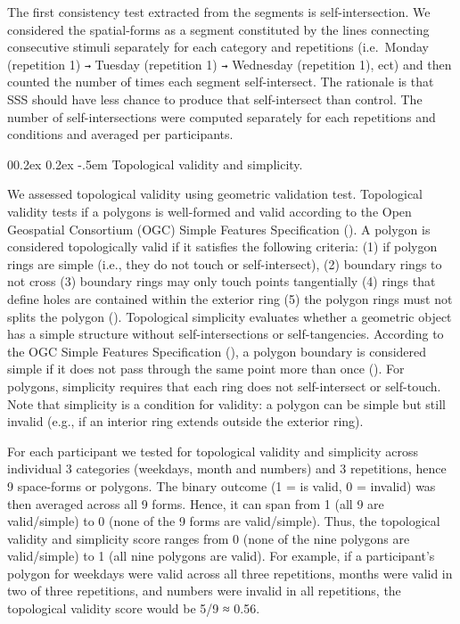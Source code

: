 \documentclass[
  man,
  longtable,
  a4paper,
  nolmodern,
  notxfonts,
  notimes,
  colorlinks=true,linkcolor=blue,citecolor=blue,urlcolor=blue]{apa7}
\makeatletter
\renewcommand{\paragraph}{\@startsection{paragraph}{4}{\parindent}%
	{0\baselineskip \@plus 0.2ex \@minus 0.2ex}%
	{-.5em}%
	{\normalfont\normalsize\bfseries\typesectitle}}
\makeatother
\begin{document}
The first consistency test extracted from the segments is
self-intersection. We considered the spatial-forms as a segment
constituted by the lines connecting consecutive stimuli separately for
each category and repetitions (i.e.~Monday (repetition 1) \texttt{→}
Tuesday (repetition 1) \texttt{→} Wednesday (repetition 1), ect) and
then counted the number of times each segment self-intersect. The
rationale is that SSS should have less chance to produce that
self-intersect than control. The number of self-intersections were
computed separately for each repetitions and conditions and averaged per
participants.

\paragraph{Topological validity and
simplicity.}\label{topological-validity-and-simplicity}

We assessed topological validity using geometric validation test.
Topological validity tests if a polygons is well-formed and valid
according to the Open Geospatial Consortium (OGC) Simple Features
Specification (). A polygon is
considered topologically valid if it satisfies the following criteria:
(1) if polygon rings are simple (i.e., they do not touch or
self-intersect), (2) boundary rings to not cross (3) boundary rings may
only touch points tangentially (4) rings that define holes are contained
within the exterior ring (5) the polygon rings must not splits the
polygon ().
Topological simplicity evaluates whether a geometric object has a simple
structure without self-intersections or self-tangencies. According to
the OGC Simple Features Specification
(), a polygon boundary is
considered simple if it does not pass through the same point more than
once (). For
polygons, simplicity requires that each ring does not self-intersect or
self-touch. Note that simplicity is a condition for validity: a polygon
can be simple but still invalid (e.g., if an interior ring extends
outside the exterior ring).

For each participant we tested for topological validity and simplicity
across individual 3 categories (weekdays, month and numbers) and 3
repetitions, hence 9 space-forms or polygons. The binary outcome (1 = is
valid, 0 = invalid) was then averaged across all 9 forms. Hence, it can
span from 1 (all 9 are valid/simple) to 0 (none of the 9 forms are
valid/simple). Thus, the topological validity and simplicity score
ranges from 0 (none of the nine polygons are valid/simple) to 1 (all
nine polygons are valid). For example, if a participant's polygon for
weekdays were valid across all three repetitions, months were valid in
two of three repetitions, and numbers were invalid in all repetitions,
the topological validity score would be 5/9 ≈ 0.56.
\end{document}

